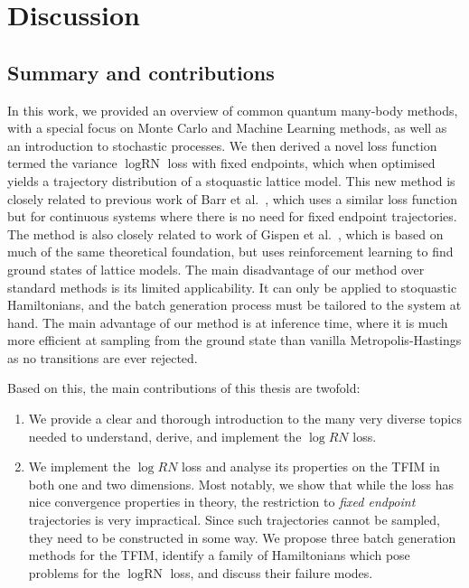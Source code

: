 
\chapter{Discussion}
\label{chapter6}

\section{Summary and contributions}
In this work, we provided an overview of common quantum many-body methods, with a special focus on Monte Carlo and Machine Learning methods, as well as an introduction to stochastic processes. We then derived a novel loss function termed the variance $\log \text{RN}$ loss with fixed endpoints, which when optimised yields a trajectory distribution of a stoquastic lattice model. This new method is closely related to previous work of Barr et al.~\cite{barr2020quantum}, which uses a similar loss function but for continuous systems where there is no need for fixed endpoint trajectories. The method is also closely related to work of Gispen et al.~\cite{gispen2020ground}, which is based on much of the same theoretical foundation, but uses reinforcement learning to find ground states of lattice models. The main disadvantage of our method over standard methods is its limited applicability. It can only be applied to stoquastic Hamiltonians, and the batch generation process must be tailored to the system at hand. The main advantage of our method is at inference time, where it is much more efficient at sampling from the ground state than vanilla Metropolis-Hastings as no transitions are ever rejected. 

Based on this, the main contributions of this thesis are twofold:

\begin{enumerate}
	\item We provide a clear and thorough introduction to the many very diverse topics needed to understand, derive, and implement the $\log {RN}$ loss. 
	\item We implement the $\log {RN}$ loss and analyse its properties on the TFIM in both one and two dimensions. Most notably, we show that while the loss has nice convergence properties in theory, the restriction to \emph{fixed endpoint} trajectories is very impractical. Since such trajectories cannot be sampled, they need to be constructed in some way. We propose three batch generation methods for the TFIM, identify a family of Hamiltonians which pose problems for the $\log{\text{RN}}$ loss, and discuss their failure modes.  
\end{enumerate}


